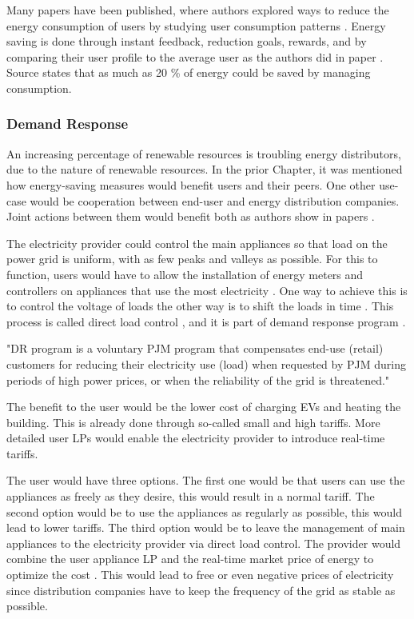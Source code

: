 Many papers have been published, where authors explored ways to reduce the energy consumption of users by studying user consumption patterns \cite{energy_saving3} \cite{energy_saving1} \cite{energy_saving4} \cite{energy_saving3}.
Energy saving is done through instant feedback, reduction goals, rewards, and by comparing their user profile to the average user as the authors did in paper \cite{Csoknyai2019}.
Source \cite{eu2006} states that as much as 20 \% of energy could be saved by managing consumption.

\subsubsection{Demand Response}

An increasing percentage of renewable resources is troubling energy distributors, due to the nature of renewable resources.
In the prior Chapter, it was mentioned how energy-saving measures would benefit users and their peers.
One other use-case would be cooperation between end-user and energy distribution companies.
Joint actions between them would benefit both as authors show in papers \cite{cooperation2008} \cite{cooperation2010}.

The electricity provider could control the main appliances so that load on the power grid is uniform,
with as few peaks and valleys as possible. For this to function, users would have to allow the installation of energy meters and controllers 
on appliances that use the most electricity \cite{gridDirectControll2015}. One way to achieve this is to control the voltage of loads \cite{controll2014} the other
way is to shift the loads in time \cite{shift2015}.
This process is called direct load control \cite{DirectLoadControll2021}, and it is part of demand response program \cite{DemandResponse2018}.

"DR program is a voluntary PJM program that compensates end-use (retail) customers for reducing their electricity use (load)
when requested by PJM during periods of high power prices, or when the reliability of the grid is threatened." \cite{DemandResponse2018}

The benefit to the user would be the lower cost of charging EVs and heating the building.
This is already done through so-called small and high tariffs.
More detailed user LPs would enable the electricity provider to introduce real-time tariffs.

The user would have three options. The first one would be that users can use the appliances as freely as they desire, this would result in a normal tariff.
The second option would be to use the appliances as regularly as possible, this would lead to lower tariffs.
The third option would be to leave the management of main appliances to the electricity provider via direct load control.
The provider would combine the user appliance LP and the real-time market price of energy to optimize the cost \cite{optimiseCostShift2015}.
This would lead to free or even negative prices of electricity since distribution companies have to keep the frequency of the grid as stable as possible.

